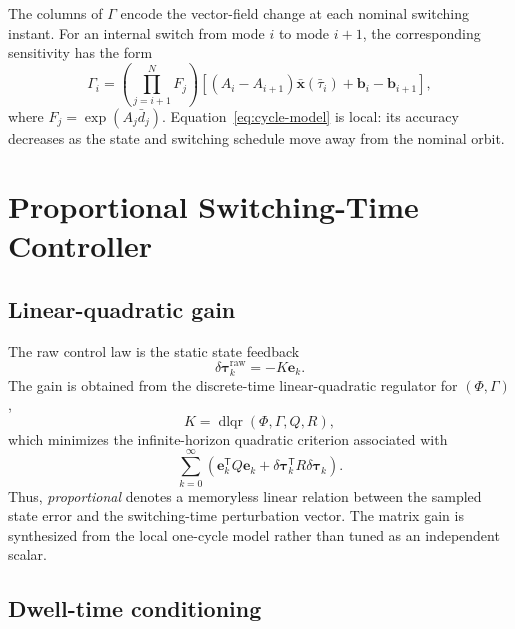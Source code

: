 \documentclass[11pt]{article}
\newcommand{\vect}[1]{\bm{#1}}
\newcommand{\dtau}{\delta\vect{\tau}}
\begin{document}
The columns of $\Gamma$ encode the vector-field change at each nominal switching instant. For an internal switch from mode $i$ to mode $i+1$, the corresponding sensitivity has the form
\begin{equation}
    \Gamma_i =
    \left(\prod_{j=i+1}^{N}F_j\right)
    \left[(A_i-A_{i+1})\bar{\vect{x}}(\bar\tau_i)
    +\vect{b}_i-\vect{b}_{i+1}\right],
    \label{eq:gamma}
\end{equation}
where $F_j=\exp(A_j\bar d_j)$. Equation~\eqref{eq:cycle-model} is local: its accuracy decreases as the state and switching schedule move away from the nominal orbit.

\section{Proportional Switching-Time Controller}
\label{sec:controller}

\subsection{Linear-quadratic gain}

The raw control law is the static state feedback
\begin{equation}
    \dtau_k^{\mathrm{raw}}=-K\vect{e}_k.
    \label{eq:control-law}
\end{equation}
The gain is obtained from the discrete-time linear-quadratic regulator for $(\Phi,\Gamma)$,
\begin{equation}
    K=\operatorname{dlqr}(\Phi,\Gamma,Q,R),
\end{equation}
which minimizes the infinite-horizon quadratic criterion associated with
\begin{equation}
    \sum_{k=0}^{\infty}
    \left(\vect{e}_k^{\mathsf T}Q\vect{e}_k
    +\dtau_k^{\mathsf T}R\dtau_k\right).
\end{equation}
Thus, \emph{proportional} denotes a memoryless linear relation between the sampled state error and the switching-time perturbation vector. The matrix gain is synthesized from the local one-cycle model rather than tuned as an independent scalar.

\subsection{Dwell-time conditioning}
\end{document}

